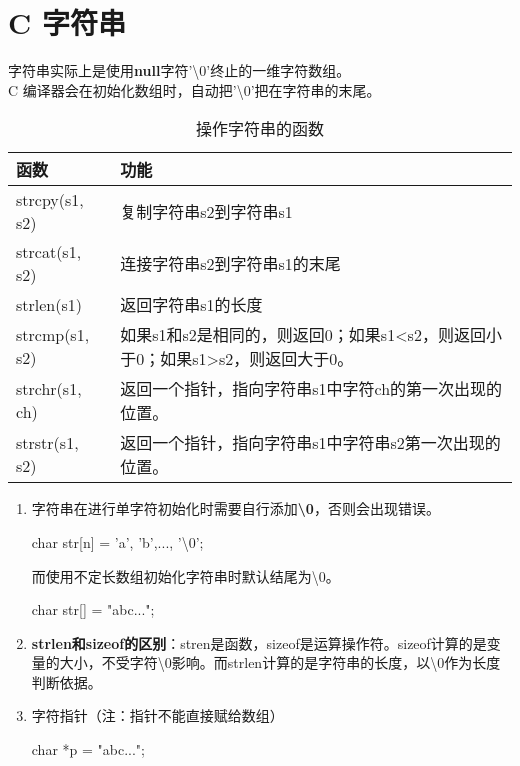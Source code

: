 \documentclass[UTF8]{ctexart}
\begin{document}
			\section{C 字符串}
			字符串实际上是使用\textbf{null}字符'\textbackslash0'终止的一维字符数组。\\
			C 编译器会在初始化数组时，自动把'\textbackslash0'把在字符串的末尾。
			\begin{table}
				\caption{操作字符串的函数}
				\begin{tabular*}{\linewidth}{l|p{25em}}
					\toprule
					函数 & 功能\\
					\midrule
					strcpy(s1, s2)&复制字符串s2到字符串s1\\
					strcat(s1, s2)&连接字符串s2到字符串s1的末尾\\
					strlen(s1)&返回字符串s1的长度\\
					strcmp(s1, s2)&如果s1和s2是相同的，则返回0；如果s1<s2，则返回小于0；如果s1>s2，则返回大于0。\\
					strchr(s1, ch)&返回一个指针，指向字符串s1中字符ch的第一次出现的位置。\\
					strstr(s1, s2)&返回一个指针，指向字符串s1中字符串s2第一次出现的位置。\\
					\bottomrule
				\end{tabular*}
			\end{table}
			\begin{framed}
				\begin{enumerate}
					\item 字符串在进行单字符初始化时需要自行添加\textbf{\textbackslash 0}，否则会出现错误。\begin{framed}
						char str[n] = {'a', 'b',..., '\textbackslash 0'};
					\end{framed}
					而使用不定长数组初始化字符串时默认结尾为\textbackslash 0。\begin{framed}
						char str[] = "abc...";
					\end{framed}
					\item \textbf{strlen和sizeof的区别}：stren是函数，sizeof是运算操作符。sizeof计算的是变量的大小，不受字符\textbackslash 0影响。而strlen计算的是字符串的长度，以\textbackslash 0作为长度判断依据。
					\item 字符指针（注：指针不能直接赋给数组）\begin{framed}
						char *p = "abc...";
					\end{framed}
				\end{enumerate}
			\end{framed}
\end{document}
